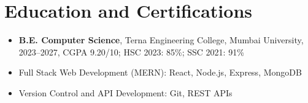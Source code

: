 \documentclass[9.5pt,a4paper]{article}
\begin{document}
\section*{Education and Certifications}
\begin{itemize}
  \item \textbf{B.E. Computer Science}, Terna Engineering College, Mumbai University, 2023--2027, CGPA 9.20/10; HSC 2023: 85\%; SSC 2021: 91\%
  \item Full Stack Web Development (MERN): React, Node.js, Express, MongoDB
  \item Version Control and API Development: Git, REST APIs
\end{itemize}
\end{document}
